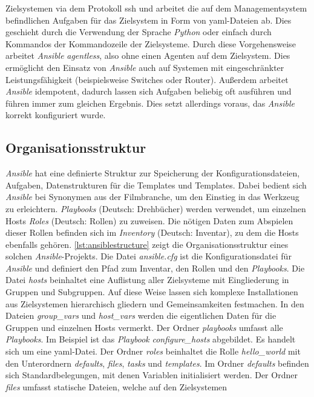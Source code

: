 \documentclass[titlepage]{report}
\begin{document}
Zielsystemen via dem Protokoll \gls{ssh} und arbeitet die auf dem
Managementsystem befindlichen Aufgaben für das Zielsystem in Form von
\gls{yaml}\hyp{}Dateien ab. Dies geschieht durch
die Verwendung der Sprache \emph{Python} oder einfach durch Kommandos 
der Kommandozeile der Zielsysteme. Durch
diese Vorgehensweise arbeitet \emph{Ansible} \emph{agentless}, also ohne
einen Agenten auf dem Zielsystem. Dies
ermöglicht den Einsatz von \emph{Ansible} auch auf Systemen mit
eingeschränkter Leistungsfähigkeit (beispielsweise Switches oder Router).
Außerdem arbeitet \emph{Ansible} idempotent, dadurch lassen sich
Aufgaben beliebig oft ausführen und führen immer zum gleichen Ergebnis.
Dies setzt allerdings voraus, das \emph{Ansible} korrekt konfiguriert
wurde.
\subsection{Organisationsstruktur}
\emph{Ansible} hat eine definierte Struktur zur Speicherung der
Konfigurationsdateien, Aufgaben, Datenstrukturen für die Templates und
Templates. Dabei bedient sich \emph{Ansible} bei Synonymen aus der
Filmbranche, um den Einstieg in das Werkzeug zu erleichtern.
\emph{Playbooks} (Deutsch: Drehbücher) werden verwendet, um einzelnen
Hosts \emph{Roles} (Deutsch: Rollen) zu zuweisen. Die nötigen Daten zum
Abspielen dieser Rollen befinden sich im \emph{Inventory} (Deutsch:
Inventar), zu dem die Hosts ebenfalls gehören. 
\autoref{lst:ansiblestructure} zeigt die Organisationsstruktur eines
solchen \emph{Ansible}\hyp{}Projekts. Die Datei \emph{ansible.cfg} ist die
Konfigurationsdatei für \emph{Ansible} und definiert den Pfad zum
Inventar, den Rollen und den \emph{Playbooks}. Die Datei \emph{hosts}
beinhaltet eine Auflistung aller Zielsysteme mit Eingliederung in
Gruppen und Subgruppen. Auf diese Weise lassen sich komplexe
Installationen aus Zielsystemen hierarchisch gliedern und
Gemeinsamkeiten festmachen. In den Dateien \emph{group\_vars} und
\emph{host\_vars} werden die eigentlichen Daten für die Gruppen und
einzelnen Hosts vermerkt. Der Ordner \emph{playbooks} umfasst alle
\emph{Playbooks}. Im Beispiel ist das \emph{Playbook}
\emph{configure\_hosts} abgebildet. Es handelt sich um eine \gls{yaml}\hyp{}Datei.
Der Ordner \emph{roles} beinhaltet die Rolle \emph{hello\_world} mit den
Unterordnern \emph{defaults}, \emph{files}, \emph{tasks} und
\emph{templates}. Im Ordner \emph{defaults} befinden sich
Standardbelegungen, mit denen Variablen initialisiert werden. Der Ordner
\emph{files} umfasst statische Dateien, welche auf den Zielsystemen
\end{document}
